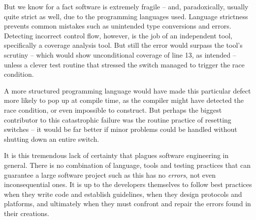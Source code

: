 \documentclass[compilation.tex]{subfiles}
\begin{document}
But we know for a fact software is extremely fragile -- and, paradoxically, usually quite strict as well, due to the programming languages used.
Language strictness prevents common mistakes such as unintended type conversions and errors.
Detecting incorrect control flow, however, is the job of an independent tool, specifically a coverage analysis tool.
But still the error would surpass the tool's scrutiny -- which would show unconditional coverage of line 13, as intended -- unless a clever test routine that stressed the switch managed to trigger the race condition.

A more structured programming language would have made this particular defect more likely to pop up at compile time, as the compiler might have detected the race condition, or even impossible to construct.
But perhaps the biggest contributor to this catastrophic failure was the routine practice of resetting switches -- it would be far better if minor problems could be handled without shutting down an entire switch.

It is this tremendous lack of certainty that plagues software engineering in general.
There is no combination of language, tools and testing practices that can guarantee a large software project such as this has no \textsl{errors}, not even inconsequential ones.
It is up to the developers themselves to follow best practices when they write code and establish guidelines, when they design protocols and platforms, and ultimately when they must confront and repair the errors found in their creations.
\end{document}
